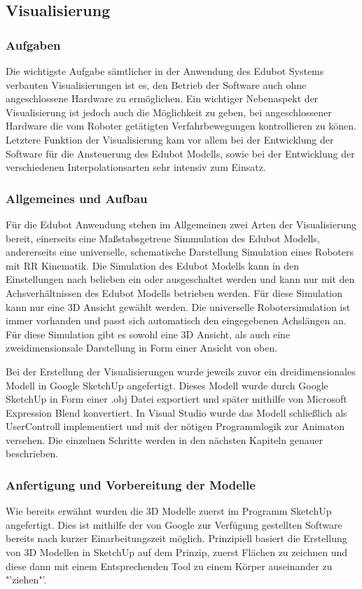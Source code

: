 \subsection{Visualisierung}

\subsubsection{Aufgaben}
Die wichtigste Aufgabe sämtlicher in der Anwendung des Edubot Systems verbauten Visualisierungen ist es, den Betrieb der Software auch ohne angeschlossene Hardware zu ermöglichen. Ein wichtiger Nebenaspekt der Visualisierung ist jedoch auch die Möglichkeit zu geben, bei angeschlossener Hardware die vom Roboter getätigten Verfahrbewegungen kontrollieren zu könen.
Letztere Funktion der Visualisierung kam vor allem bei der Entwicklung der Software für die Ansteuerung des Edubot Modells, sowie bei der Entwicklung der verschiedenen Interpolationsarten sehr intensiv zum Einsatz. 
\subsubsection{Allgemeines und Aufbau}
Für die Edubot Anwendung stehen im Allgemeinen zwei Arten der Visualisierung bereit, einerseits eine Maßstabsgetreue Simmulation des Edubot Modells, andererseits eine universelle, schematische Darstellung Simulation eines Roboters mit RR Kinematik. 
Die Simulation des Edubot Modells kann in den Einstellungen nach belieben ein oder ausgeschaltet werden und kann nur mit den Achsverhältnissen des Edubot Modells betrieben werden. Für diese Simulation kann nur eine 3D Ansicht gewählt werden.
Die universelle Robotersimulation ist immer vorhanden und passt sich automatisch den eingegebenen Achslängen an. Für diese Simulation gibt es sowohl eine 3D Ansicht, als auch eine zweidimensionsale Darstellung in Form einer Ansicht von oben. 

Bei der Erstellung der Visualisierungen wurde jeweils zuvor ein dreidimensionales Modell in Google SketchUp angefertigt. Dieses Modell wurde durch Google SketchUp in Form einer .obj Datei exportiert und später mithilfe von Microsoft Expression Blend konvertiert. In Visual Studio wurde das Modell schließlich als UserControll implementiert und mit der nötigen Programmlogik zur Animaton versehen.
Die einzelnen Schritte werden in den nächsten Kapiteln genauer beschrieben.
\subsubsection{Anfertigung und Vorbereitung der Modelle}
Wie bereits erwähnt wurden die 3D Modelle zuerst im Programm SketchUp angefertigt. Dies ist mithilfe der von Google zur Verfügung gestellten Software bereits nach kurzer Einarbeitungszeit möglich. 
Prinzipiell basiert die Erstellung von 3D Modellen in SketchUp auf dem Prinzip, zuerst Flächen zu zeichnen und diese dann mit einem Entsprechenden Tool zu einem Körper auseinander zu "'ziehen"'.

